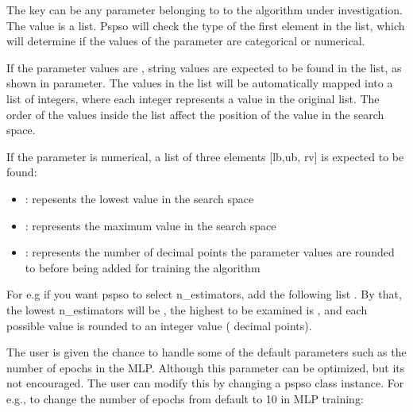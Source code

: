\documentclass[letterpaper,10pt,english]{sphinxmanual}
\begin{document}
The key can be any parameter belonging to to the algorithm under investigation.
The value is a list.
Pspso will check the type of the first element in the list, which will determine if the values of the parameter are categorical or numerical.


If the parameter values are , string values are expected to be found in the list, as shown in  parameter.
The values in the list will be automatically mapped into a list of integers, where each integer represents a value in the original list.
The order of the values inside the list affect the position of the value in the search space.


If the parameter is numerical, a list of three elements {[}lb,ub, rv{]} is expected to be found:
\begin{itemize}
\item {} 
: repesents the lowest value in the search space

\item {} 
: represents the maximum value in the search space

\item {} 
: represents the number of decimal points the parameter values are rounded to before being added for training the algorithm

\end{itemize}

For e.g if you want pspso to select n\_estimators, add the following list \sphinxstyleemphasis{{[}2,200,0{]}}.
By that, the lowest n\_estimators will be , the highest to be examined is , and each possible value is rounded to an integer value (  decimal points).


The user is given the chance to handle some of the default parameters
such as the number of epochs in the MLP. Although this parameter can be optimized, but its not encouraged. The user can modify this by changing a
pspso class instance. For e.g., to change the number of
epochs from default to 10 in MLP training:
\end{document}
